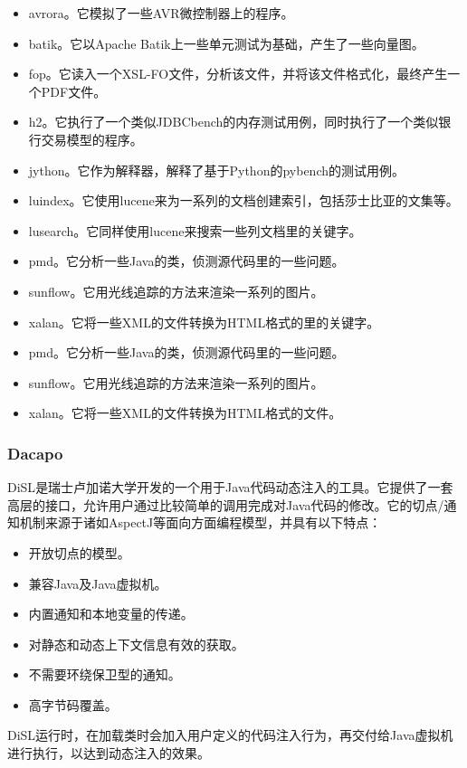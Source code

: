 \begin{itemize}
	\item avrora。它模拟了一些AVR微控制器上的程序。
	\item batik。它以Apache Batik上一些单元测试为基础，产生了一些向量图。
	\item fop。它读入一个XSL-FO文件，分析该文件，并将该文件格式化，最终产生一个PDF文件。
	\item h2。它执行了一个类似JDBCbench的内存测试用例，同时执行了一个类似银行交易模型的程序。
	\item jython。它作为解释器，解释了基于Python的pybench的测试用例。
	\item luindex。它使用lucene来为一系列的文档创建索引，包括莎士比亚的文集等。
	\item lusearch。它同样使用lucene来搜索一些列文档里的关键字。
	\item pmd。它分析一些Java的类，侦测源代码里的一些问题。
	\item sunflow。它用光线追踪的方法来渲染一系列的图片。
	\item xalan。它将一些XML的文件转换为HTML格式的里的关键字。
	\item pmd。它分析一些Java的类，侦测源代码里的一些问题。
	\item sunflow。它用光线追踪的方法来渲染一系列的图片。
	\item xalan。它将一些XML的文件转换为HTML格式的文件。
\end{itemize}

\subsubsection{Dacapo}

DiSL\cite{disl}是瑞士卢加诺大学开发的一个用于Java代码动态注入的工具。它提供了一套高层的接口，允许用户通过比较简单的调用完成对Java代码的修改。它的切点/通知机制来源于诸如AspectJ等面向方面编程模型，并具有以下特点：

\begin{itemize}
	\item 开放切点的模型。
	\item 兼容Java及Java虚拟机。
	\item 内置通知和本地变量的传递。
	\item 对静态和动态上下文信息有效的获取。
	\item 不需要环绕保卫型的通知。
	\item 高字节码覆盖。
\end{itemize}

DiSL运行时，在加载类时会加入用户定义的代码注入行为，再交付给Java虚拟机进行执行，以达到动态注入的效果。

